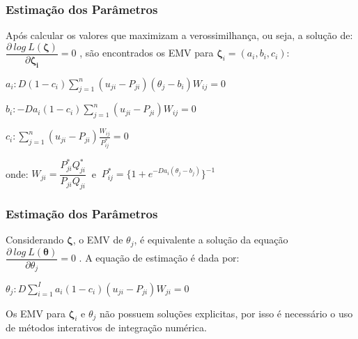 \documentclass{beamer}
\begin{document}
	\begin{frame}
		
		\frametitle{Estimação dos Parâmetros }
		
		Após calcular os valores que maximizam a verossimilhança, ou seja, a solução de: $\dfrac{\partial~log~ L(\boldsymbol{\zeta})}{\partial \boldsymbol{\zeta_i}} = 0$ , são encontrados os EMV para $ \boldsymbol{\zeta}_i = (a_i, b_i , c_i )$:\newline
		
		$
		a_i: D(1 - c_i)\sum_{j=1}^{n}(u_{ji} - P_{ji})(\theta_j - b_i)W_{ij} = 0
		$\newline
		
		$
		b_i: -Da_i(1 - c_i)\sum_{j=1}^{n}(u_{ji} - P_{ji})W_{ij} = 0
		$\newline
		
		$ 
		c_i: \sum_{j=1}^{n}(u_{ji} - P_{ji})\frac{W_{ij}}{P^*_{ij}} = 0
		$  \newline
		
		\begin{center} onde: \space
			$ W_{ji} = \dfrac{P_{ji}^*Q_{ji}^*}{P_{ji}Q_{ji}} ~$ e $ ~ 
			P^*_{ij} = \{1 + e^{-Da_i(\theta_j - b_j)}\}^{-1} $
		\end{center}

			
\end{frame}
	
	\begin{frame}
		
		\frametitle{Estimação dos Parâmetros }
		
		Considerando $\boldsymbol{\zeta}$, o EMV de $\theta_j$, é equivalente a solução da equação
		$\dfrac{\partial~log~ L(\boldsymbol{\theta})}{\partial \theta_j} = 0$ .
		A equação de estimação é dada por:\newline \newline
		
		
		$ \theta_j : D\sum_{i=1}^{I}{a_i(1-c_i)(u_{ji}-P_{ji})W_{ji}} = 0 $ \newline \newline
		
		Os EMV para $ \boldsymbol{\zeta}_i$ e $\theta_j$ não possuem soluções explicitas, por isso é necessário o uso de métodos interativos de integração numérica.
		
	\end{frame}
	
\end{document}
